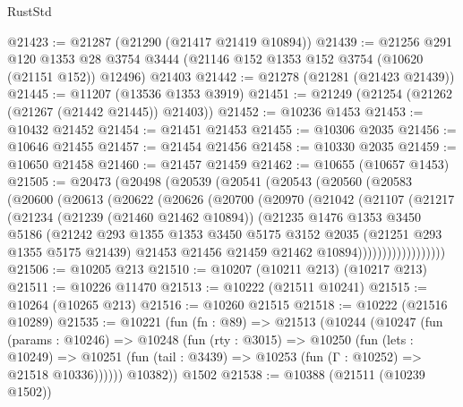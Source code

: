 \begin{lexlean}{RustStd}
\begin{coremodule}
@21423 := @21287 (@21290 (@21417 @21419 @10894))
@21439 := @21256
    @291
    @120
    @1353
    @28
    @3754
    @3444
    (@21146 @152 @1353 @152 @3754 (@10620 (@21151 @152)) @12496)
    @21403
@21442 := @21278 (@21281 (@21423 @21439))
@21445 := @11207 (@13536 @1353 @3919)
@21451 := @21249 (@21254 (@21262 (@21267 (@21442 @21445)) @21403))
@21452 := @10236 @1453
@21453 := @10432 @21452
@21454 := @21451 @21453
@21455 := @10306 @2035
@21456 := @10646 @21455
@21457 := @21454 @21456
@21458 := @10330 @2035
@21459 := @10650 @21458
@21460 := @21457 @21459
@21462 := @10655 (@10657 @1453)
@21505 := @20473
    (@20498
      (@20539
        (@20541
          (@20543
            (@20560
              (@20583
                (@20600
                  (@20613
                    (@20622
                      (@20626
                        (@20700
                          (@20970
                            (@21042
                              (@21107
                                (@21217
                                  (@21234
                                    (@21239 (@21460 @21462 @10894))
                                    (@21235
                                      @1476
                                      @1353
                                      @3450
                                      @5186
                                      (@21242
                                        @293
                                        @1355
                                        @1353
                                        @3450
                                        @5175
                                        @3152
                                        @2035
                                        (@21251 @293 @1355 @5175 @21439)
                                        @21453
                                        @21456
                                        @21459
                                        @21462
                                        @10894))))))))))))))))))
@21506 := @10205 @213
@21510 := @10207 (@10211 @213) (@10217 @213)
@21511 := @10226 @11470
@21513 := @10222 (@21511 @10241)
@21515 := @10264 (@10265 @213)
@21516 := @10260 @21515
@21518 := @10222 (@21516 @10289)
@21535 := @10221
    (fun (fn : @89) =>
    @21513
      (@10244
        (@10247
          (fun (params : @10246) =>
          @10248
            (fun (rty : @3015) =>
            @10250
              (fun (lets : @10249) =>
              @10251 (fun (tail : @3439) => @10253 (fun (Γ : @10252) => @21518 @10336))))))
        @10382))
    @1502
@21538 := @10388 (@21511 (@10239 @1502))

\end{coremodule}
\end{lexlean}
